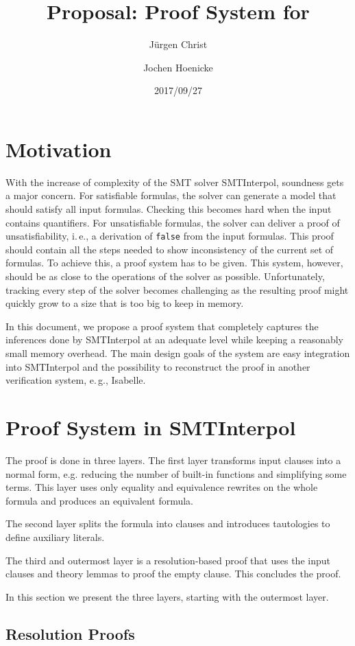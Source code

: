\documentclass[a4paper]{article}
\title{Proposal: Proof System for \siv}
\author{J{\"u}rgen Christ \and Jochen Hoenicke}
\date{2017/09/27}
\newcommand\si{SMTInterpol\xspace}
\begin{document}
\maketitle
\section{Motivation}
With the increase of complexity of the SMT solver \si, soundness gets a major
concern.  For satisfiable formulas, the solver can generate a model that
should satisfy all input formulas.  Checking this becomes hard when the input
contains quantifiers.  For unsatisfiable formulas, the solver can deliver a
proof of unsatisfiability, i.\,e., a derivation of \texttt{false} from the
input formulas.  This proof should contain all the steps needed to show
inconsistency of the current set of formulas.  To achieve this, a proof system
has to be given.  This system, however, should be as close to the operations
of the solver as possible.  Unfortunately, tracking every step of the solver
becomes challenging as the resulting proof might quickly grow to a size that is
too big to keep in memory.

In this document, we propose a proof system that completely captures
the inferences done by \si at an adequate level while keeping a
reasonably small memory overhead.  The main design goals of the system
are easy integration into \si and the possibility to reconstruct the
proof in another verification system, e.\,g., Isabelle.

\section{Proof System in \si}

The proof is done in three layers.  The first layer transforms input
clauses into a normal form, e.g. reducing the number of built-in
functions and simplifying some terms. This layer uses only equality
and equivalence rewrites on the whole formula and produces an
equivalent formula.

The second layer splits the formula into clauses and introduces
tautologies to define auxiliary literals.

The third and outermost layer is a resolution-based proof that uses
the input clauses and theory lemmas to proof the empty clause.
This concludes the proof.

In this section we present the three layers, starting with the
outermost layer.

\subsection{Resolution Proofs}
\end{document}

